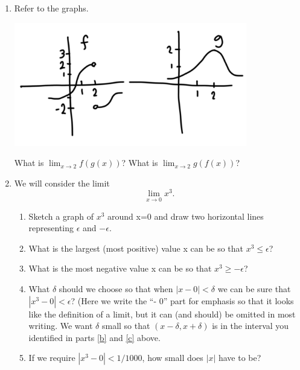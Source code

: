 \documentclass[11pt]{book}
\numberwithin{example}{chapter}
\begin{document}
\begin{enumerate}

\item
Refer to the graphs.

\begin{center}
\includegraphics[width=4in]{limitExerciseImage1.png}
\end{center}

What is $\lim_{x\to 2} f(g(x))$?  What is $\lim_{x\to 2} g(f(x))$?




\item 

We will consider the limit $$\lim_{x\to 0} x^3.$$ 

\begin{enumerate}
\item 
Sketch a graph of $x^3$ around x=0 and draw two horizontal lines representing $\epsilon$ and $-\epsilon$. 



\item \label{b}
 What is the largest (most positive) value x can be so that   $x^3\leq \epsilon$?  
 

 
 \item \label{c}
  What is the most negative value x can be so that $x^3\geq -\epsilon$?



\item
What $\delta$ should we choose so that when $|x-0|<\delta$ we can be sure that $|x^3-0|<\epsilon$?  (Here we write the ``- 0'' part for emphasis so that it looks like the definition of a limit, but it can (and should) be omitted in most writing.  We want $\delta$ small so that $(x-\delta,x+\delta)$ is in the interval you identified in parts \ref{b} and \ref{c} above.



\item
If we require $|x^3-0|<1/1000$, how small does $|x|$ have to be?  




\end{enumerate}
\end{enumerate}
\end{document}
